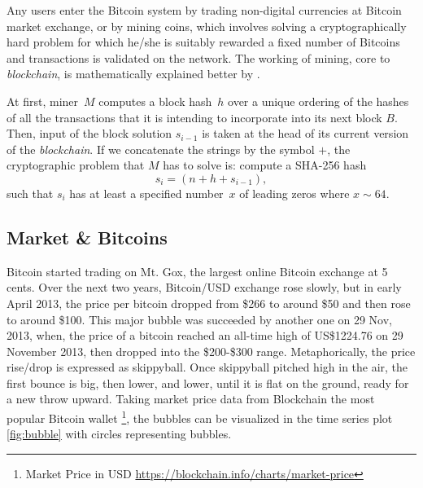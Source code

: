 \documentclass[12pt,a4paper]{article}
\numberwithin{equation}{section}
\numberwithin{figure}{section}
\numberwithin{table}{section}
\begin{document}
Any users enter the Bitcoin system by trading non-digital currencies at Bitcoin market exchange, or by mining coins, which involves solving a cryptographically hard problem for which he/she is suitably rewarded a fixed number of Bitcoins  and transactions is validated on the network. The working of mining, core to {\it blockchain}, is mathematically explained better by \cite{Johannes2015}. 

At first, miner~$M$ computes a block hash~$h$ over a unique ordering
of the hashes of all the transactions that it is intending to incorporate into its next block $B$.  Then, input of the block solution $s_{i-1}$ is taken at the head of its current version of the {\it blockchain}. If we concatenate the strings by the symbol $+$, the cryptographic problem that $M$ has to solve is: compute a SHA-256 hash
%
\begin{equation} \label{eq:1.1}
s_i = (n + h + s_{i-1}),
\end{equation}
%
such that $s_i$ has at least a specified number~$x$ of leading zeros where $x \sim 64$. 

\subsection{Market \& Bitcoins}
\label{subsec:Market and Bitcoins}

Bitcoin started trading	 on Mt.	Gox, the largest online	 Bitcoin exchange at 5 cents. Over the next	 two	 years,	Bitcoin/USD exchange rose slowly, but in early April 2013, the price per bitcoin dropped from \$266 to around \$50 and then rose to around \$100. This major bubble was succeeded by another one on 29 Nov, 2013, when, the price of a bitcoin reached an all-time high of US\$1224.76 on 29 November 2013, then dropped into the \$200-\$300 range. Metaphorically, the price rise/drop is expressed as skippyball. Once skippyball pitched high in the air, the first bounce is big, then lower, and lower, until it is flat on the ground, ready for a new throw upward. Taking market price data from Blockchain the most popular Bitcoin wallet \footnote{Market Price in USD \url{https://blockchain.info/charts/market-price}}, the bubbles can be visualized in the time series plot \ref{fig:bubble} with circles representing bubbles.
\end{document}
